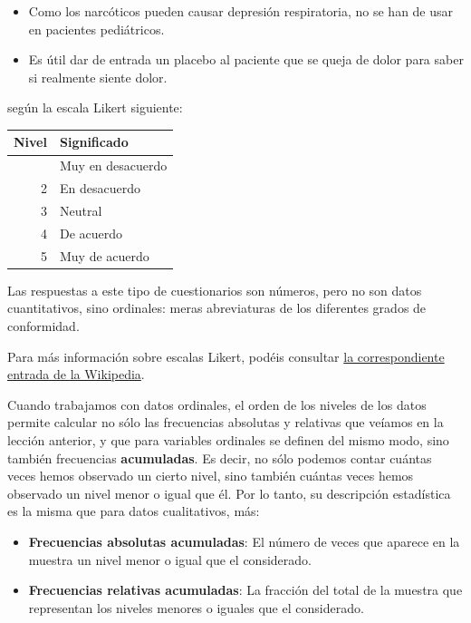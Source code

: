 \documentclass[
  spanish,
  letterpaper,
  DIV=11,
  numbers=noendperiod]{scrreprt}
\newcounter{none} %
\begin{document}
\begin{itemize}
\item
  Como los narcóticos pueden causar depresión respiratoria, no se han de
  usar en pacientes pediátricos.
\item
  Es útil dar de entrada un placebo al paciente que se queja de dolor
  para saber si realmente siente dolor.
\end{itemize}

según la escala Likert siguiente:

{\def\LTcaptype{none} %
\begin{longtable}[]{@{}rl@{}}
\toprule\noalign{}
Nivel & Significado \\
\midrule\noalign{}
\endhead
\bottomrule\noalign{}
\endlastfoot
1 & Muy en desacuerdo \\
2 & En desacuerdo \\
3 & Neutral \\
4 & De acuerdo \\
5 & Muy de acuerdo \\
\end{longtable}
}

Las respuestas a este tipo de cuestionarios son números, pero no son
datos cuantitativos, sino ordinales: meras abreviaturas de los
diferentes grados de conformidad.

Para más información sobre escalas Likert, podéis consultar
\href{http://es.wikipedia.org/wiki/Escalas_Likert}{la correspondiente
entrada de la Wikipedia}.

Cuando trabajamos con datos ordinales, el orden de los niveles de los
datos permite calcular no sólo las frecuencias absolutas y relativas que
veíamos en la lección anterior, y que para variables ordinales se
definen del mismo modo, sino también frecuencias \textbf{acumuladas}. Es
decir, no sólo podemos contar cuántas veces hemos observado un cierto
nivel, sino también cuántas veces hemos observado un nivel menor o igual
que él. Por lo tanto, su descripción estadística es la misma que para
datos cualitativos, más:

\begin{itemize}
\item
  \textbf{Frecuencias absolutas acumuladas}: El número de veces que
  aparece en la muestra un nivel menor o igual que el considerado.
\item
  \textbf{Frecuencias relativas acumuladas}: La fracción del total de la
  muestra que representan los niveles menores o iguales que el
  considerado.
\end{itemize}
\end{document}

